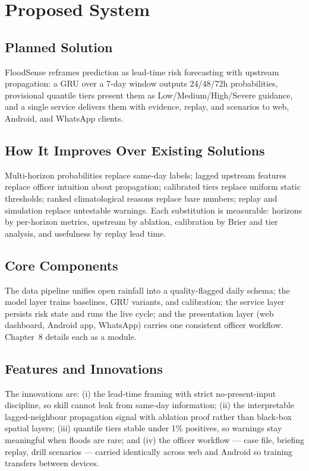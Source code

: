 \documentclass[a4paper,12pt]{report}
\begin{document}
\chapter{Proposed System}
\section{Planned Solution}
FloodSense reframes prediction as lead-time risk forecasting with upstream propagation: a GRU over a 7-day window outputs 24/48/72h probabilities, provisional quantile tiers present them as Low/Medium/High/Severe guidance, and a single service delivers them with evidence, replay, and scenarios to web, Android, and WhatsApp clients.

\section{How It Improves Over Existing Solutions}
Multi-horizon probabilities replace same-day labels; lagged upstream features replace officer intuition about propagation; calibrated tiers replace uniform static thresholds; ranked climatological reasons replace bare numbers; replay and simulation replace untestable warnings. Each substitution is measurable: horizons by per-horizon metrics, upstream by ablation, calibration by Brier and tier analysis, and usefulness by replay lead time.

\section{Core Components}
The data pipeline unifies open rainfall into a quality-flagged daily schema; the model layer trains baselines, GRU variants, and calibration; the service layer persists risk state and runs the live cycle; and the presentation layer (web dashboard, Android app, WhatsApp) carries one consistent officer workflow. Chapter~8 details each as a module.

\section{Features and Innovations}
The innovations are: (i) the lead-time framing with strict no-present-input discipline, so skill cannot leak from same-day information; (ii) the interpretable lagged-neighbour propagation signal with ablation proof rather than black-box spatial layers; (iii) quantile tiers stable under 1\% positives, so warnings stay meaningful when floods are rare; and (iv) the officer workflow --- case file, briefing replay, drill scenarios --- carried identically across web and Android so training transfers between devices.
\end{document}
